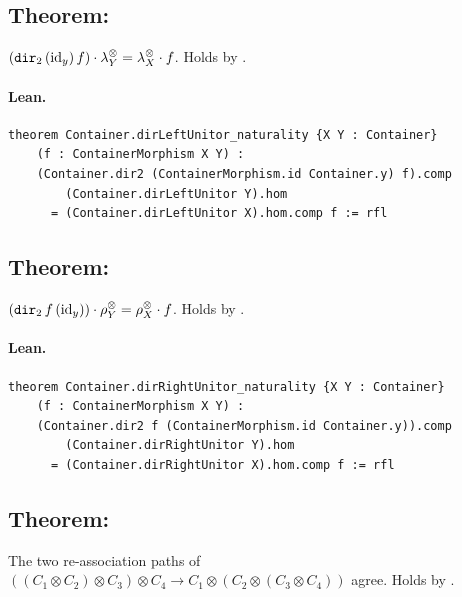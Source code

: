 \documentclass[11pt,a4paper]{article}
\begin{document}
\subsection{Theorem: }

\begin{thm}
$(\texttt{dir}_2\,(\mathrm{id}_y)\,f) \cdot \lambda^\otimes_Y = \lambda^\otimes_X \cdot f$.
Holds by .
\end{thm}

\paragraph{Lean.}
\begin{lstlisting}[style=lean]
theorem Container.dirLeftUnitor_naturality {X Y : Container}
    (f : ContainerMorphism X Y) :
    (Container.dir2 (ContainerMorphism.id Container.y) f).comp
        (Container.dirLeftUnitor Y).hom
      = (Container.dirLeftUnitor X).hom.comp f := rfl
\end{lstlisting}


\subsection{Theorem: }

\begin{thm}
$(\texttt{dir}_2\,f\,(\mathrm{id}_y)) \cdot \rho^\otimes_Y = \rho^\otimes_X \cdot f$.
Holds by .
\end{thm}

\paragraph{Lean.}
\begin{lstlisting}[style=lean]
theorem Container.dirRightUnitor_naturality {X Y : Container}
    (f : ContainerMorphism X Y) :
    (Container.dir2 f (ContainerMorphism.id Container.y)).comp
        (Container.dirRightUnitor Y).hom
      = (Container.dirRightUnitor X).hom.comp f := rfl
\end{lstlisting}


\subsection{Theorem: }

\begin{thm}
The two re-association paths of
$((C_1 \otimes C_2) \otimes C_3) \otimes C_4 \to
  C_1 \otimes (C_2 \otimes (C_3 \otimes C_4))$ agree.
Holds by .
\end{thm}
\end{document}
